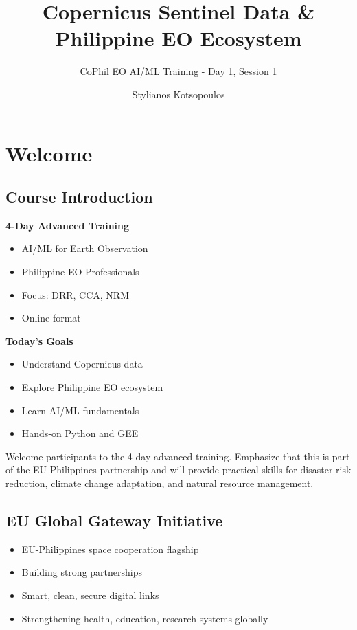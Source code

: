 \documentclass[
  letterpaper,
  DIV=11,
  numbers=noendperiod]{scrartcl}
\title{Copernicus Sentinel Data \& Philippine EO Ecosystem}
\subtitle{CoPhil EO AI/ML Training - Day 1, Session 1}
\author{Stylianos Kotsopoulos}
\date{}
\providecommand{\tightlist}{%
  \setlength{\itemsep}{0pt}\setlength{\parskip}{0pt}}
\begin{document}
\maketitle


\section{Welcome}\label{welcome}

\subsection{Course Introduction}\label{course-introduction}

\textbf{4-Day Advanced Training}

\begin{itemize}
\tightlist
\item
  AI/ML for Earth Observation
\item
  Philippine EO Professionals
\item
  Focus: DRR, CCA, NRM
\item
  Online format
\end{itemize}

\textbf{Today's Goals}

\begin{itemize}
\tightlist
\item
  Understand Copernicus data
\item
  Explore Philippine EO ecosystem
\item
  Learn AI/ML fundamentals
\item
  Hands-on Python and GEE
\end{itemize}

Welcome participants to the 4-day advanced training. Emphasize that this
is part of the EU-Philippines partnership and will provide practical
skills for disaster risk reduction, climate change adaptation, and
natural resource management.

\subsection{EU Global Gateway
Initiative}\label{eu-global-gateway-initiative}

\begin{itemize}
\tightlist
\item
  EU-Philippines space cooperation flagship
\item
  Building strong partnerships
\item
  Smart, clean, secure digital links
\item
  Strengthening health, education, research systems globally
\end{itemize}
\end{document}
